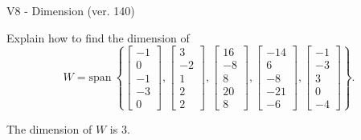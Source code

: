 \begin{exercise}
  \begin{exerciseTitle}V8 - Dimension (ver. 140)\end{exerciseTitle}
  \begin{exerciseStatement}
    Explain how to find the dimension of 
\[W=\mathrm{span}\ \left\{\left[\begin{array}{r}
-1 \\
0 \\
-1 \\
-3 \\
0
\end{array}\right] , \left[\begin{array}{r}
3 \\
-2 \\
1 \\
2 \\
2
\end{array}\right] , \left[\begin{array}{r}
16 \\
-8 \\
8 \\
20 \\
8
\end{array}\right] , \left[\begin{array}{r}
-14 \\
6 \\
-8 \\
-21 \\
-6
\end{array}\right] , \left[\begin{array}{r}
-1 \\
-3 \\
3 \\
0 \\
-4
\end{array}\right]\right\}.\]



  \end{exerciseStatement}
  \begin{exerciseAnswer}
   The dimension of \(W\) is  \(3\).
  


  \end{exerciseAnswer}
\end{exercise}